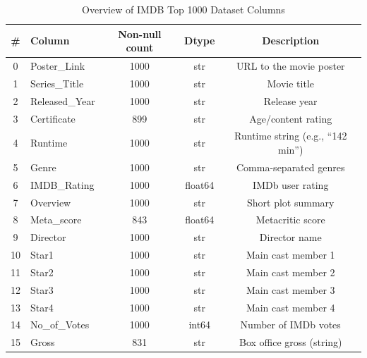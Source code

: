 \documentclass{article}  %
\begin{document}
\begin{table}[!htbp]
    \caption{Overview of IMDB Top 1000 Dataset Columns}
    \centering
    \begin{tabular}{clccc}
        \toprule
        \# & \textbf{Column}      & \textbf{Non-null count} & \textbf{Dtype}   & \textbf{Description} \\
        \midrule
        0  & Poster\_Link   & 1000 & str     & URL to the movie poster \\
        1  & Series\_Title  & 1000 & str     & Movie title \\
        2  & Released\_Year & 1000 & str     & Release year \\
        3  & Certificate    & 899  & str     & Age/content rating \\
        4  & Runtime        & 1000 & str     & Runtime string (e.g., ``142 min'') \\
        5  & Genre          & 1000 & str     & Comma-separated genres \\
        6  & IMDB\_Rating & 1000 & float64 & IMDb user rating \\
        7  & Overview       & 1000 & str     & Short plot summary \\
        8  & Meta\_score & 843  & float64 & Metacritic score \\
        9  & Director       & 1000 & str     & Director name \\
        10 & Star1          & 1000 & str     & Main cast member 1 \\
        11 & Star2          & 1000 & str     & Main cast member 2 \\
        12 & Star3          & 1000 & str     & Main cast member 3 \\
        13 & Star4          & 1000 & str     & Main cast member 4 \\
        14 & No\_of\_Votes & 1000 & int64   & Number of IMDb votes \\
        15 & Gross          & 831  & str     & Box office gross (string) \\
        \bottomrule
    \end{tabular}
    \label{tab:1}
\end{table}
\end{document}

